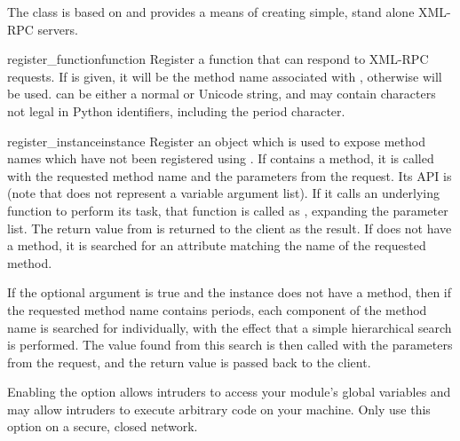 The  class is based on
 and provides a means of creating
simple, stand alone XML-RPC servers.

\begin{methoddesc}[SimpleXMLRPCServer]{register_function}{function}
  Register a function that can respond to XML-RPC requests.  If
   is given, it will be the method name associated with
  , otherwise  will be
  used.   can be either a normal or Unicode string, and may
  contain characters not legal in Python identifiers, including the
  period character.
\end{methoddesc}

\begin{methoddesc}[SimpleXMLRPCServer]{register_instance}{instance}
  Register an object which is used to expose method names which have
  not been registered using .  If
   contains a  method, it is called
  with the requested method name and the parameters from the request.  Its
  API is  (note that
   does not represent a variable argument list).  If it calls an
  underlying function to perform its task, that function is called as
  , expanding the parameter list.
  The return value from  is returned to the client as
  the result.  If
   does not have a  method, it is
  searched for an attribute matching the name of the requested method.

  If the optional  argument is true and the
  instance does not have a  method, then
  if the requested method name contains periods, each component of the
  method name is searched for individually, with the effect that a
  simple hierarchical search is performed.  The value found from this
  search is then called with the parameters from the request, and the
  return value is passed back to the client.

  \begin{notice}[warning]
  Enabling the  option allows intruders to access
  your module's global variables and may allow intruders to execute
  arbitrary code on your machine.  Only use this option on a secure,
  closed network.
  \end{notice}


\end{methoddesc}

